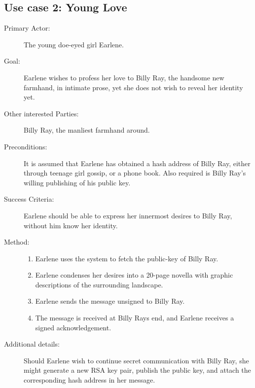 \subsection{Use case 2: Young Love}
\begin{description}
\item[Primary Actor:] The young doe-eyed girl Earlene.
\item[Goal:] Earlene wishes to profess her love to Billy Ray, the handsome new farmhand, in intimate prose, yet she does not wish to reveal her identity yet. 
\item[Other interested Parties:] Billy Ray, the manliest farmhand around.
\item[Preconditions:] It is assumed that Earlene has obtained a hash address of Billy Ray, either through teenage girl gossip, or a phone book. Also required is Billy Ray's willing publishing of his public key.
\item[Success Criteria:] Earlene should be able to express her innermost desires to Billy Ray, without him know her identity.
\item[Method:]
\begin{enumerate}
\item Earlene uses the system to fetch the public-key of Billy Ray.
\item Earlene condenses her desires into a 20-page novella with graphic descriptions of the surrounding landscape.
\item Earlene sends the message unsigned to Billy Ray.
\item The message is received at Billy Rays end, and Earlene receives a signed acknowledgement.
\end{enumerate}
\item[Additional details:] Should Earlene wish to continue secret communication with Billy Ray, she might generate a new RSA key pair, publish the public key, and attach the corresponding hash address in her message.
\end{description}